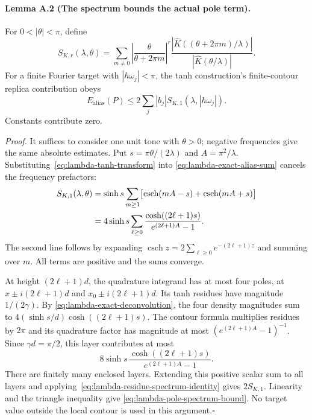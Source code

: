 \documentclass[11pt]{article}
\begin{document}
\paragraph{Lemma A.2 (The spectrum bounds the actual pole term).}
For $0<|\theta|<\pi$, define
\begin{equation}
 S_{K,r}(\lambda,\theta)=
 \sum_{m\ne0}\left|\frac{\theta}{\theta+2\pi m}\right|^r
 \frac{|\widehat K((\theta+2\pi m)/\lambda)|}
 {|\widehat K(\theta/\lambda)|}.
 \label{eq:lambda-exact-alias-sum}
\end{equation}
For a finite Fourier target with $|h\omega_j|<\pi$, the tanh construction's
finite-contour replica contribution obeys
\begin{equation}
 E_{\mathrm{alias}}(P)\le
 2\sum_j|b_j|S_{K,1}(\lambda,|h\omega_j|).
 \label{eq:lambda-pole-spectrum-bound}
\end{equation}
Constants contribute zero.

\emph{Proof.}
It suffices to consider one unit tone with $\theta>0$; negative
frequencies give the same absolute estimates. Put
$s=\pi\theta/(2\lambda)$ and $A=\pi^2/\lambda$.
Substituting~\eqref{eq:lambda-tanh-transform} into
\eqref{eq:lambda-exact-alias-sum} cancels the frequency prefactors:
\begin{align}
 S_{K,1}(\lambda,\theta)
 &=\sinh s\sum_{m\ge1}
   \bigl[\operatorname{csch}(mA-s)+\operatorname{csch}(mA+s)\bigr]
 \notag\\
 &=4\sinh s\sum_{\ell\ge0}
   \frac{\cosh((2\ell+1)s)}{e^{(2\ell+1)A}-1}.
 \label{eq:lambda-residue-spectrum-identity}
\end{align}
The second line follows by expanding
$\operatorname{csch}z=2\sum_{\ell\ge0}e^{-(2\ell+1)z}$ and summing
over $m$. All terms are positive and the sums converge.

At height $(2\ell+1)d$, the quadrature integrand has at most four poles,
at $x\pm i(2\ell+1)d$ and $x_0\pm i(2\ell+1)d$. Its tanh residues
have magnitude $1/(2\gamma)$. By
\eqref{eq:lambda-exact-deconvolution}, the four density magnitudes sum to
$4(\sinh s/d)\cosh((2\ell+1)s)$.
The contour formula multiplies residues by $2\pi$ and its quadrature
factor has magnitude at most $(e^{(2\ell+1)A}-1)^{-1}$. Since
$\gamma d=\pi/2$, this layer contributes at most
\[
 8\sinh s\,
 \frac{\cosh((2\ell+1)s)}{e^{(2\ell+1)A}-1}.
\]
There are finitely many enclosed layers. Extending this positive scalar
sum to all layers and applying~\eqref{eq:lambda-residue-spectrum-identity}
gives $2S_{K,1}$. Linearity and the triangle inequality give
\eqref{eq:lambda-pole-spectrum-bound}. No target value outside the local
contour is used in this argument.\hfill$\square$
\end{document}
